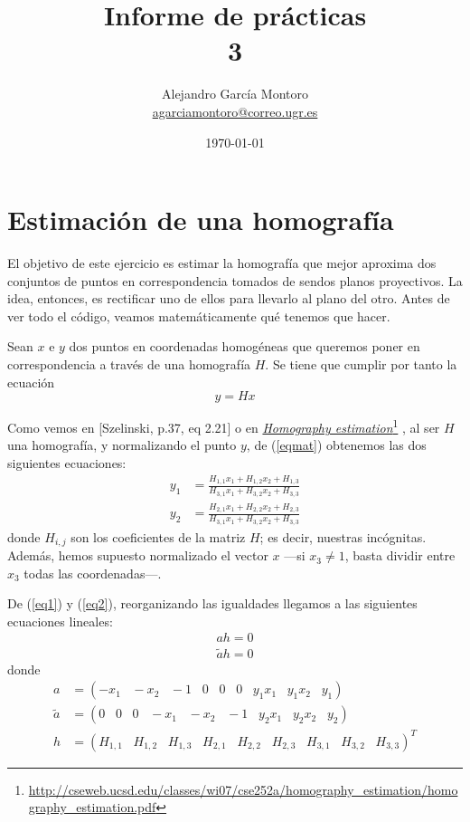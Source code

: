 \documentclass[a4paper, 11pt]{article}
\title{Informe de prácticas \\ 3}
\author{Alejandro García Montoro\\
    \href{mailto:agarciamontoro@correo.ugr.es}{agarciamontoro@correo.ugr.es}}
\date{\today}
\newcommand\fnurl[2]{%
  \href{#2}{#1}\footnote{\url{#2}}%
}
\theoremstyle{definition}
\theoremstyle{theorem}
\begin{document}
  \maketitle

  \section{Estimación de una homografía}
  El objetivo de este ejercicio es estimar la homografía que mejor aproxima dos conjuntos de puntos en correspondencia tomados de sendos planos proyectivos. La idea, entonces, es rectificar uno de ellos para llevarlo al plano del otro. Antes de ver todo el código, veamos matemáticamente qué tenemos que hacer.

  Sean $x$ e $y$ dos puntos en coordenadas homogéneas que queremos poner en correspondencia a través de una homografía $H$. Se tiene que cumplir por tanto la ecuación
  \begin{equation}
      y = Hx \label{eqmat}
  \end{equation}

  Como vemos en [Szelinski, p.37, eq 2.21] o en \fnurl{\emph{Homography estimation}}{http://cseweb.ucsd.edu/classes/wi07/cse252a/homography_estimation/homography_estimation.pdf}, al ser $H$ una homografía, y normalizando el punto $y$, de (\ref{eqmat}) obtenemos las dos siguientes ecuaciones:
  \begin{align}
      y_1 &= \frac{H_{1,1}x_1 + H_{1,2}x_2 + H_{1,3}}{H_{3,1}x_1 + H_{3,2}x_2 + H_{3,3}} \label{eq1}\\
      y_2 &= \frac{H_{2,1}x_1 + H_{2,2}x_2 + H_{2,3}}{H_{3,1}x_1 + H_{3,2}x_2 + H_{3,3}} \label{eq2}
  \end{align}
  donde $H_{i,j}$ son los coeficientes de la matriz $H$; es decir, nuestras incógnitas. Además, hemos supuesto normalizado el vector $x$ ---si $x_3\neq1$, basta dividir entre $x_3$ todas las coordenadas---.

  De (\ref{eq1}) y (\ref{eq2}), reorganizando las igualdades llegamos a las siguientes ecuaciones lineales:
  \begin{align}
      ah = 0 \label{lineal1}\\
      \tilde{a}h = 0 \label{lineal2}
  \end{align}
  donde
  \begin{align*}
      a &= (-x_1 \;\;\; -x_2 \;\;\; -1 \;\;\; 0 \;\;\; 0 \;\;\; 0 \;\;\; y_1x_1 \;\;\; y_1x_2 \;\;\; y_1) \\
      \tilde{a} &= (0 \;\;\; 0 \;\;\; 0 \;\;\; -x_1 \;\;\; -x_2 \;\;\; -1 \;\;\; y_2x_1 \;\;\; y_2x_2 \;\;\; y_2) \\
      h &= (H_{1,1} \;\;\; H_{1,2} \;\;\; H_{1,3} \;\;\; H_{2,1} \;\;\; H_{2,2} \;\;\; H_{2,3} \;\;\; H_{3,1} \;\;\; H_{3,2} \;\;\; H_{3,3})^T
  \end{align*}
\end{document}
